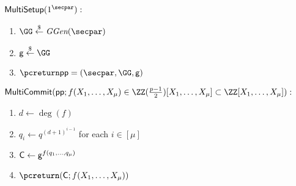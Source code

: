  \begin{mdframed}[userdefinedwidth=\textwidth]
\begin{minipage}{\textwidth}
	\begin{flushleft}
	$\pro{MultiSetup}(1^\secpar):$
		\begin{enumerate}[nolistsep]
			\item $ \GG \sample \ggen(\secpar)$
			\item $ \gr{g} \sample \GG$
			\item $\pcreturn \params = (\secpar,\GG,\gr{g})$
		\end{enumerate}
	$\pro{MultiCommit}(\params;f(X_1,\dots,X_\mu) \in \ZZ(\frac{p-1}{2})[X_1, \ldots, X_\mu]\subset \ZZ[X_1, \ldots, X_\mu]):$ 		\begin{enumerate}[nolistsep]
			\item $d\gets \deg(f)$
			\item $q_i\gets q^{(d+1)^{i-1}}$ for each $i\in [\mu]$
			\item $\mathsf{C} \gets \mathsf{g}^{f(q_1,\dots,q_\mu)}$
			\item $\pcreturn (\gr{C};f(X_1,\dots,X_\mu))$
		\end{enumerate}
			\end{flushleft}
\end{minipage}
\end{mdframed}
 
